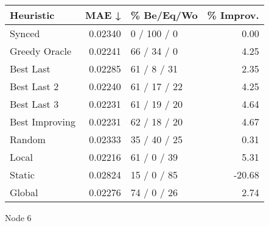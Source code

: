 \begin{tabular}{lrlr}
\toprule
\textbf{Heuristic} & \textbf{MAE ↓} & \textbf{\% Be/Eq/Wo} & \textbf{\% Improv.} \\
\midrule
            Synced &        0.02340 &          0 / 100 / 0 &                0.00 \\
     Greedy Oracle &        0.02241 &          66 / 34 / 0 &                4.25 \\
         Best Last &        0.02285 &          61 / 8 / 31 &                2.35 \\
       Best Last 2 &        0.02240 &         61 / 17 / 22 &                4.25 \\
       Best Last 3 &        0.02231 &         61 / 19 / 20 &                4.64 \\
    Best Improving &        0.02231 &         62 / 18 / 20 &                4.67 \\
            Random &        0.02333 &         35 / 40 / 25 &                0.31 \\
             Local &        0.02216 &          61 / 0 / 39 &                5.31 \\
            Static &        0.02824 &          15 / 0 / 85 &              -20.68 \\
            Global &        0.02276 &          74 / 0 / 26 &                2.74 \\
\bottomrule
\end{tabular}
\caption{Node 6}
\label{tab:iid_lr01_le2_bs4_6}
